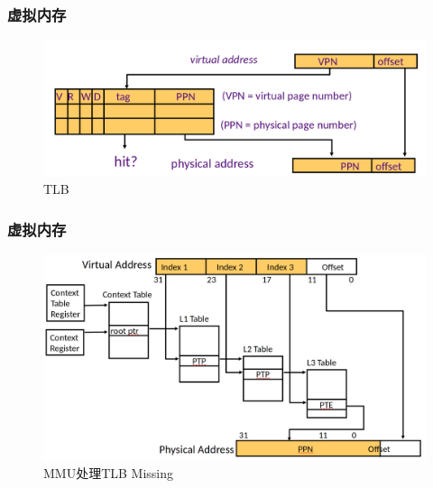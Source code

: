 \documentclass[UTF8]{ctexbeamer}
\begin{document}
\begin{frame}
	
	\frametitle{虚拟内存}
	
	\begin{figure}
		\centering
		\includegraphics[width=1\linewidth]{tlb}
		\caption{TLB}
	\end{figure}
	
\end{frame}

\begin{frame}
	
	\frametitle{虚拟内存}
	
	\begin{figure}
		\centering
		\includegraphics[width=0.85\linewidth]{mmu}
		\caption{MMU处理TLB Missing}
	\end{figure}
	
\end{frame}
\end{document}
